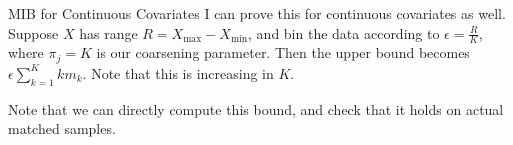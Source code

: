 \documentclass{beamer}
\begin{document}
\begin{frame}{MIB for Continuous Covariates}
	I can prove this for continuous covariates as well. Suppose $X$ has range $R = X_{\max} - X_{\min}$, and bin the data according to $\epsilon = \frac{R}{K}$, where $\pi_j = K$ is our coarsening parameter. Then the upper bound becomes $\epsilon \sum_{k=1}^K k m_k$. Note that this is increasing in $K$. \linebreak
	
	Note that we can directly compute this bound, and check that it holds on actual matched samples.
\end{frame}



\end{document}
